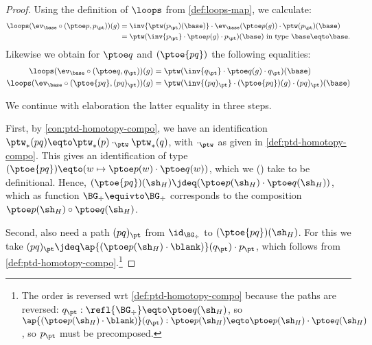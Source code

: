 {\begin{proof}
Using the definition of $\loops$ from \cref{def:loops-map},
we calculate:
\begin{align*}
\loops(\ev_{\base}\circ (\ptoe p,p_\pt))(g) &= 
\inv{\ptw(p_\pt)(\base)} \cdot \ev_{\base}(\ptoe p(g)) \cdot {\ptw(p_\pt)(\base)}\\
              &= 
\ptw (\inv{p_\pt} \cdot \ptoe p(g) \cdot p_\pt)(\base)
~\text{in type $\base\eqto\base$}.
\end{align*}
Likewise we obtain for $\ptoe q$ and $(\ptoe{pq})$ the following
equalities:
\begin{align*}
\loops(\ev_{\base}\circ (\ptoe q,q_\pt))(g) &=  
\ptw (\inv{q_\pt} \cdot \ptoe q(g) \cdot q_\pt)(\base)
\\
\loops(\ev_{\base}\circ (\ptoe {pq},(pq)_\pt))(g) &=  
\ptw (\inv{(pq)_\pt} \cdot (\ptoe{pq})(g) \cdot (pq)_\pt)(\base)
\end{align*}

We continue with elaboration the latter equality in three steps.

First, by \cref{con:ptd-homotopy-compo}, we have an identification
$\ptw_*(pq) \eqto \ptw_*(p) \cdot_{\ptw} \ptw_*(q)$,
with $\cdot_{\ptw}$ as given in \cref{def:ptd-homotopy-compo}.
This gives an identification of type
$(\ptoe{pq})\eqto(w\mapsto \ptoe p(w)\cdot\ptoe q(w))$,
which we () take to be definitional.
Hence, $(\ptoe{pq})(\sh_H)\jdeq (\ptoe p(\sh_H)\cdot\ptoe q(\sh_H))$,
which as function $\BG_\div\equivto\BG_\div$ corresponds to
the composition $\ptoe p(\sh_H) \circ \ptoe q(\sh_H)$.

Second, also need a path $(pq)_\pt$ from $\id_{\BG_\div}$ 
to $(\ptoe{pq})(\sh_H)$. For this we take
$(pq)_\pt \jdeq \ap{(\ptoe p(\sh_H)\cdot\blank)}(q_\pt)\cdot p_\pt$,
which follows from \cref{def:ptd-homotopy-compo}.\footnote{%
The order is reversed wrt \ref{def:ptd-homotopy-compo}
because the paths are reversed: 
$q_\pt: \refl{\BG_\div}\eqto \ptoe q(\sh_H)$,
so $\ap{(\ptoe p(\sh_H)\cdot\blank)}(q_\pt): \ptoe p(\sh_H) \eqto 
\ptoe p(\sh_H) \cdot \ptoe q(\sh_H)$, so $p_\pt$ must be precomposed.   
}


\end{proof}}
